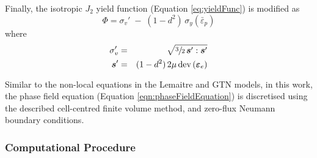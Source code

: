 \documentclass[sn-mathphys,Numbered]{sn-jnl}%
\newcommand{\bb}{\boldsymbol}
\begin{document}
Finally, the isotropic $J_2$ yield function (Equation \ref{eq:yieldFunc}) is modified as \citep{borden_phase-field_2016}
\begin{equation}
	\Phi = \sigma_{v}' \; - \; (1 - d^2) \, \sigma_y\left(\bar{\varepsilon}_p \right)
\end{equation}
where 
\begin{eqnarray}
	\sigma_{v}' &=& \sqrt{\sfrac{3}{2} \, \bb{s}' : \bb{s}'} \\
	\boldsymbol{s}' &=& (1 - d^2)\, 2 \mu \, \text{dev}\left(\bb{\varepsilon}_{e}\right)
\end{eqnarray}

Similar to the non-local equations in the Lemaitre and GTN models, in this work, the phase field equation (Equation \ref{eqn:phaseFieldEquation}) is discretised using the described cell-centred finite volume method, and zero-flux Neumann boundary conditions.


\subsubsection{Computational Procedure}
\end{document}
